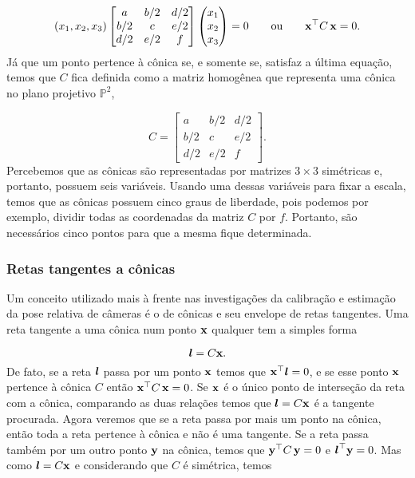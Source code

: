 \begin{equation*}
(x_1,x_2,x_3) 
 \begin{bmatrix}
  a & b/2 & d/2\\
  b/2 & c & e/2\\
  d/2 & e/2 & f
  \end{bmatrix}
 \begin{pmatrix}
  x_1\\
  x_2\\
  x_3
  \end{pmatrix}
 = 0
 \qquad \text{ou} \qquad
 \mathbf{x}^\top C\,\mathbf{x} = 0.
\end{equation*}
Já que um ponto pertence à cônica se, e somente se, satisfaz a última equação, temos que $C$ fica definida como a matriz homogênea que representa uma cônica no plano projetivo $\mathbb{P}^2$,

\begin{equation*}
C =  \begin{bmatrix}
      a & b/2 & d/2\\
      b/2 & c & e/2\\
      d/2 & e/2 & f
      \end{bmatrix}.
\end{equation*}
Percebemos que as cônicas são representadas por matrizes $3\times3$ simétricas e, portanto, possuem seis variáveis. Usando uma dessas variáveis para fixar a escala, temos que as cônicas possuem cinco graus de liberdade, pois podemos por exemplo, dividir todas as coordenadas da matriz $C$ por $f$. Portanto, são necessários cinco pontos para que a mesma fique determinada.  \\

\subsubsection*{Retas tangentes a cônicas} 

Um conceito utilizado mais à frente nas investigações da calibração e estimação da pose relativa de câmeras é o de cônicas e seu envelope de retas tangentes. Uma reta tangente a uma cônica num ponto $\mathbf{x}$ qualquer tem a simples forma

\begin{equation*}
\boldsymbol{l}=C\mathbf{x}.
\end{equation*}
De fato, se a reta $\boldsymbol{l}$ passa por um ponto $\mathbf{x}$ temos que $\mathbf{x}^\top\boldsymbol{l}=0$, e se esse ponto $\mathbf{x}$ pertence à cônica $C$ então $\mathbf{x}^\top C\,\mathbf{x}=0$. Se $\mathbf{x}$ é o único ponto de interseção da reta com a cônica, comparando as duas relações  temos que $\boldsymbol{l}=C\mathbf{x}$ é a tangente procurada. Agora veremos que se a reta passa por mais um ponto na cônica, então toda a reta pertence à cônica e não é uma tangente.
Se a reta passa também por um outro ponto ${\bf y}$ na cônica, temos que ${\bf y}^\top C\,{\bf y}=0$ e $\boldsymbol{l}^\top{\bf y}=0$. Mas como $\boldsymbol{l}=C\mathbf{x}$ e considerando que $C$ é simétrica, temos


